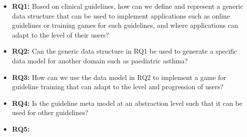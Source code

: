 
\begin{itemize}
	\item \textbf{RQ1:} Based on clinical guidelines, how can we define and represent a generic data structure that can be used to implement applications such as online guidelines or training games for such guidelines, and where applications can adapt to the level of their users?
	\item \textbf{RQ2:} Can the generic data structure in RQ1 be used to generate a specific data model for another domain such as paediatric asthma?
	\item \textbf{RQ3:} How can we use the data model in RQ2 to implement a game for guideline training that can adapt to the level and progression  of users?
	\item \textbf{RQ4:} Is the guideline meta model at an abstraction level such that it can be used for other guidelines? 
	\item \textbf{RQ5:}
\end{itemize}